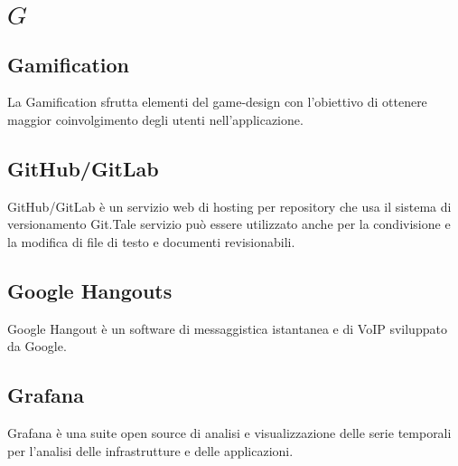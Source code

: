 \section{\quad$G\quad$}
\subsection{Gamification}
La Gamification sfrutta elementi del game-design con l’obiettivo di ottenere maggior coinvolgimento degli utenti nell’applicazione.

\subsection{GitHub/GitLab}
GitHub/GitLab è un servizio web di hosting per repository che usa il sistema di versionamento Git.Tale servizio può essere utilizzato anche per la condivisione e la modifica di file di testo e documenti revisionabili.

\subsection{Google Hangouts}
Google Hangout è un software di messaggistica istantanea e di VoIP sviluppato da Google.


\subsection{Grafana}
Grafana è una suite open source di analisi e visualizzazione delle serie temporali per l'analisi delle infrastrutture e delle applicazioni.

